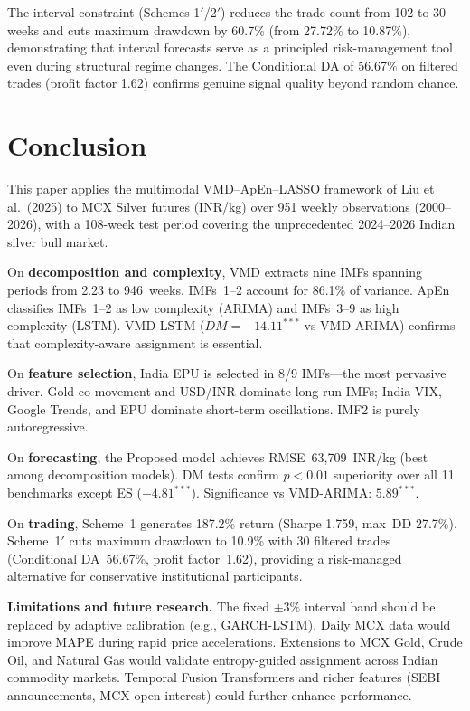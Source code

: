 \documentclass[12pt,a4paper]{article}
\begin{document}
\begin{insightbox}[title=\textbf{KEY FINDING}]
The interval constraint (Schemes 1$'$/2$'$) reduces the trade count from 102 to 30
weeks and cuts maximum drawdown by 60.7\% (from 27.72\% to 10.87\%), demonstrating
that interval forecasts serve as a principled risk-management tool even during
structural regime changes. The Conditional DA of 56.67\% on filtered trades
(profit factor 1.62) confirms genuine signal quality beyond random chance.
\end{insightbox}

\section{Conclusion}

This paper applies the multimodal VMD--ApEn--LASSO framework of Liu et al.\ (2025)
to MCX Silver futures (INR/kg) over 951 weekly observations (2000--2026), with a
108-week test period covering the unprecedented 2024--2026 Indian silver bull market.

On \textbf{decomposition and complexity}, VMD extracts nine IMFs spanning periods from
2.23 to 946~weeks. IMFs~1--2 account for 86.1\% of variance. ApEn classifies IMFs~1--2
as low complexity (ARIMA) and IMFs~3--9 as high complexity (LSTM). VMD-LSTM
($DM=-14.11^{***}$ vs VMD-ARIMA) confirms that complexity-aware assignment is essential.

On \textbf{feature selection}, India EPU is selected in 8/9 IMFs---the most pervasive
driver. Gold co-movement and USD/INR dominate long-run IMFs; India VIX, Google Trends,
and EPU dominate short-term oscillations. IMF2 is purely autoregressive.

On \textbf{forecasting}, the Proposed model achieves RMSE~63,709~INR/kg (best among
decomposition models). DM tests confirm $p<0.01$ superiority over all 11 benchmarks
except ES ($-4.81^{***}$). Significance vs VMD-ARIMA: $5.89^{***}$.

On \textbf{trading}, Scheme~1 generates 187.2\% return (Sharpe 1.759, max~DD 27.7\%).
Scheme~1$'$ cuts maximum drawdown to 10.9\% with 30 filtered trades (Conditional
DA~56.67\%, profit factor~1.62), providing a risk-managed alternative for conservative
institutional participants.

\medskip\noindent\textbf{Limitations and future research.} The fixed $\pm3\%$ interval
band should be replaced by adaptive calibration (e.g., GARCH-LSTM). Daily MCX data
would improve MAPE during rapid price accelerations. Extensions to MCX Gold, Crude
Oil, and Natural Gas would validate entropy-guided assignment across Indian commodity
markets. Temporal Fusion Transformers and richer features (SEBI announcements, MCX
open interest) could further enhance performance.
\end{document}
